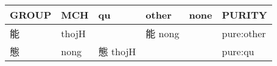 \documentclass[14pt,a4paper]{scrartcl}
\begin{document}
\begin{longtable}[c]{@{}llllll@{}}
\toprule
\begin{minipage}[b]{0.14\columnwidth}\raggedright\strut
GROUP
\strut\end{minipage} &
\begin{minipage}[b]{0.14\columnwidth}\raggedright\strut
MCH
\strut\end{minipage} &
\begin{minipage}[b]{0.14\columnwidth}\raggedright\strut
qu
\strut\end{minipage} &
\begin{minipage}[b]{0.14\columnwidth}\raggedright\strut
other
\strut\end{minipage} &
\begin{minipage}[b]{0.14\columnwidth}\raggedright\strut
none
\strut\end{minipage} &
\begin{minipage}[b]{0.14\columnwidth}\raggedright\strut
PURITY
\strut\end{minipage}\tabularnewline
\midrule
\endhead
\begin{minipage}[t]{0.14\columnwidth}\raggedright\strut
能
\strut\end{minipage} &
\begin{minipage}[t]{0.14\columnwidth}\raggedright\strut
thojH
\strut\end{minipage} &
\begin{minipage}[t]{0.14\columnwidth}\raggedright\strut
\strut\end{minipage} &
\begin{minipage}[t]{0.14\columnwidth}\raggedright\strut
能 nong
\strut\end{minipage} &
\begin{minipage}[t]{0.14\columnwidth}\raggedright\strut
\strut\end{minipage} &
\begin{minipage}[t]{0.14\columnwidth}\raggedright\strut
pure:other
\strut\end{minipage}\tabularnewline
\begin{minipage}[t]{0.14\columnwidth}\raggedright\strut
態
\strut\end{minipage} &
\begin{minipage}[t]{0.14\columnwidth}\raggedright\strut
nong
\strut\end{minipage} &
\begin{minipage}[t]{0.14\columnwidth}\raggedright\strut
態 thojH
\strut\end{minipage} &
\begin{minipage}[t]{0.14\columnwidth}\raggedright\strut
\strut\end{minipage} &
\begin{minipage}[t]{0.14\columnwidth}\raggedright\strut
\strut\end{minipage} &
\begin{minipage}[t]{0.14\columnwidth}\raggedright\strut
pure:qu
\strut\end{minipage}\tabularnewline
\bottomrule
\end{longtable}
\end{document}
